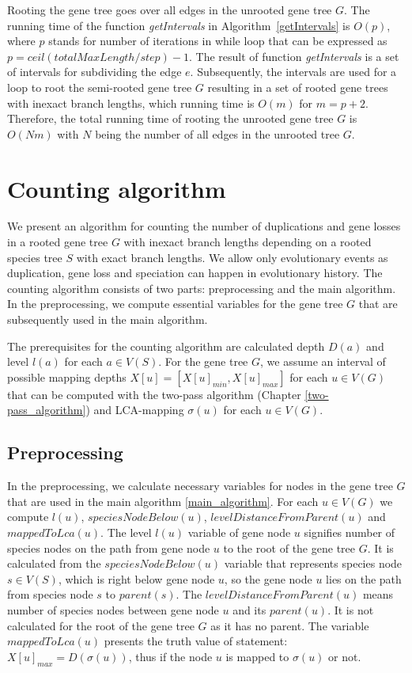 Rooting the gene tree goes over all edges in the unrooted gene tree $G$. The running time of the function \emph{getIntervals} in Algorithm~\ref{getIntervals} is $O(p)$, where $p$ stands for number of iterations in while loop that can be expressed as $p = ceil(totalMaxLength/step) - 1$. The result of function \emph{getIntervals} is a set of intervals for subdividing the edge $e$. Subsequently, the intervals are used for a loop to root the semi-rooted gene tree $G$ resulting in a set of rooted gene trees with inexact branch lengths, which running time is $O(m)$ for $m = p+2$. Therefore, the total running time of rooting the unrooted gene tree $G$ is $O(Nm)$ with $N$ being the number of all edges in the unrooted tree $G$.


\section{Counting algorithm} \label{counting_algorithm}

We present an algorithm for counting the number of duplications and gene losses in a rooted gene tree $G$ with inexact branch lengths depending on a rooted species tree $S$ with exact branch lengths. We allow only evolutionary events as duplication, gene loss and speciation can happen in evolutionary history. The counting algorithm consists of two parts: preprocessing and the main algorithm. In the preprocessing, we compute essential variables for the gene tree $G$ that are subsequently used in the main algorithm.

The prerequisites for the counting algorithm are calculated depth $D(a)$ and level $l(a)$ for each $a \in V(S)$. For the gene tree $G$, we assume an interval of possible mapping depths $X[u] = [ X[u]_{min}, X[u]_{max} ]$ for each $u \in V(G)$ that can be computed with the two-pass algorithm (Chapter \ref{two-pass_algorithm}) and LCA-mapping $\sigma(u)$ for each $u \in V(G)$.

\subsection{Preprocessing} \label{preprocessing}

In the preprocessing, we calculate necessary variables for nodes in the gene tree $G$ that are used in the main algorithm \ref{main_algorithm}. For each $u \in V(G)$ we compute $l(u)$, $speciesNodeBelow(u)$, $levelDistanceFromParent(u)$ and $mappedToLca(u)$. The level $l(u)$ variable of gene node $u$ signifies number of species nodes on the path from gene node $u$ to the root of the gene tree $G$. It is calculated from the $speciesNodeBelow(u)$ variable that represents species node $s \in V(S)$, which is right below gene node $u$, so the gene node $u$ lies on the path from species node $s$ to $parent(s)$. The $levelDistanceFromParent(u)$ means number of species nodes between gene node $u$ and its $parent(u)$. It is not calculated for the root of the gene tree $G$ as it has no parent. The variable $mappedToLca(u)$ presents the truth value of statement: $X[u]_{max} = D(\sigma(u))$, thus if the node $u$ is mapped to $\sigma(u)$ or not. 

